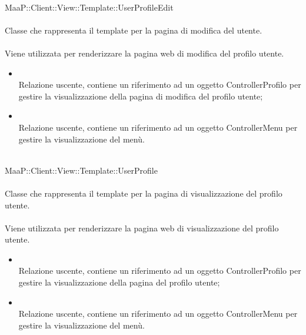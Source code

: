 \\
MaaP::Client::View::Template::UserProfileEdit\\
\\
Classe che rappresenta il template per la pagina di modifica del  utente.\\
\\
Viene utilizzata per renderizzare la pagina web di modifica del profilo utente.\\
\begin{itemize}
\item{}\\
Relazione uscente, contiene un riferimento ad un oggetto ControllerProfilo per gestire la visualizzazione della pagina di modifica del profilo utente;
\item{}\\
Relazione uscente, contiene un riferimento ad un oggetto ControllerMenu per gestire la visualizzazione del menù.
\end{itemize}

\\
MaaP::Client::View::Template::UserProfile\\
\\
Classe che rappresenta il template per la pagina di visualizzazione del profilo utente.\\
\\
Viene utilizzata per renderizzare la pagina web di visualizzazione del profilo utente.\\
\begin{itemize}
\item{}\\
Relazione uscente, contiene un riferimento ad un oggetto ControllerProfilo per gestire la visualizzazione della pagina del profilo utente;
\item{}\\
Relazione uscente, contiene un riferimento ad un oggetto ControllerMenu per gestire la visualizzazione del menù.
\end{itemize}

